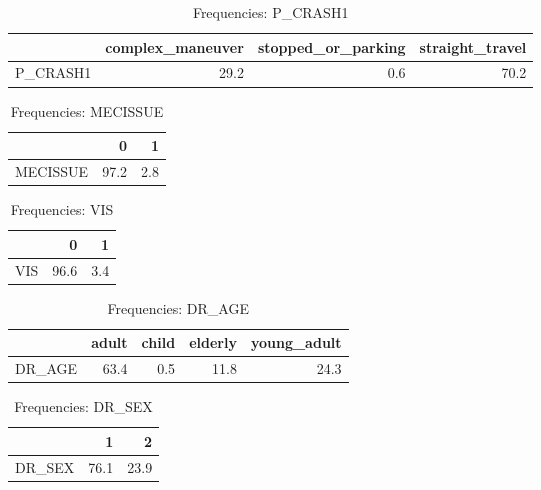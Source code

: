 \begin{table}[ht]
\centering
\begin{tabular}{rrrr}
  \toprule
 & complex\_maneuver & stopped\_or\_parking & straight\_travel \\ 
  \midrule
P\_CRASH1 & 29.2 & 0.6 & 70.2 \\ 
   \bottomrule
\end{tabular}
\caption{Frequencies: P_CRASH1} 
\end{table}
\begin{table}[ht]
\centering
\begin{tabular}{rrr}
  \toprule
 & 0 & 1 \\ 
  \midrule
MECISSUE & 97.2 & 2.8 \\ 
   \bottomrule
\end{tabular}
\caption{Frequencies: MECISSUE} 
\end{table}
\begin{table}[ht]
\centering
\begin{tabular}{rrr}
  \toprule
 & 0 & 1 \\ 
  \midrule
VIS & 96.6 & 3.4 \\ 
   \bottomrule
\end{tabular}
\caption{Frequencies: VIS} 
\end{table}
\begin{table}[ht]
\centering
\begin{tabular}{rrrrr}
  \toprule
 & adult & child & elderly & young\_adult \\ 
  \midrule
DR\_AGE & 63.4 & 0.5 & 11.8 & 24.3 \\ 
   \bottomrule
\end{tabular}
\caption{Frequencies: DR_AGE} 
\end{table}
\begin{table}[ht]
\centering
\begin{tabular}{rrr}
  \toprule
 & 1 & 2 \\ 
  \midrule
DR\_SEX & 76.1 & 23.9 \\ 
   \bottomrule
\end{tabular}
\caption{Frequencies: DR_SEX} 
\end{table}
